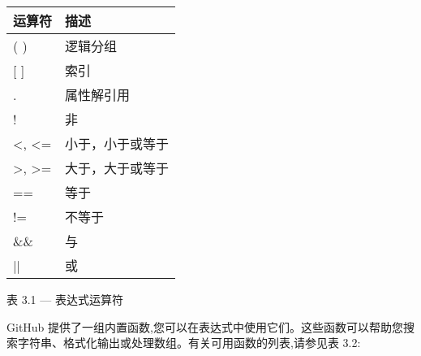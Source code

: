 \begin{longtable}[c]{|l|l|}
\hline
\textbf{运算符}              & \textbf{描述}                   \\ \hline
\endfirsthead
%
\endhead
%
( )                            & 逻辑分组                       \\ \hline
{[} {]}                        & 索引                                  \\ \hline
.                              & 属性解引用                  \\ \hline
!                              & 非                                    \\ \hline
\textless , \textless{}=       & 小于，小于或等于      \\ \hline
\textgreater , \textgreater{}= & 大于，大于或等于 \\ \hline
==                             & 等于                                  \\ \hline
!=                             & 不等于                              \\ \hline
\&\&                           & 与                                    \\ \hline
||                             & 或                                     \\ \hline
\end{longtable}

\begin{center}
表 3.1 --- 表达式运算符
\end{center}

GitHub 提供了一组内置函数,您可以在表达式中使用它们。这些函数可以帮助您搜索字符串、格式化输出或处理数组。有关可用函数的列表,请参见表 3.2:


